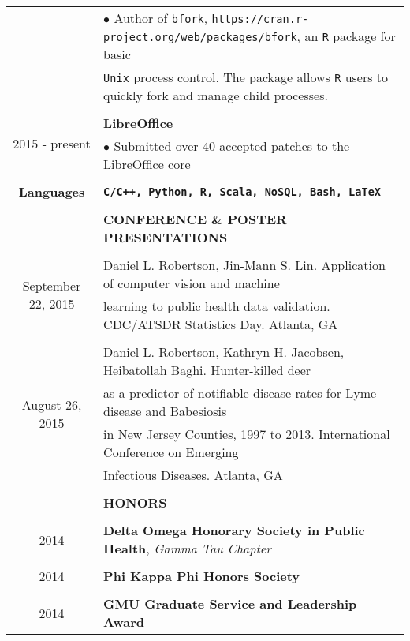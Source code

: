 \documentclass[10pt]{article}
\begin{document}
\begin{table}[ht]
\begin{tabular}{@{\hspace{0mm}}c@{\hspace{1mm}}c@{\hspace{3mm}}cl}
            & & & $\bullet$ Author of \texttt{bfork}, \texttt{https://cran.r-project.org/web/packages/bfork}, an \texttt{R} package for basic\\
            & & & \hspace*{3mm}\texttt{Unix} process control. The package allows \texttt{R} users to quickly fork and manage child processes.\\
            \\
            \multicolumn{3}{c}{\multirow{2}{*}{2015 - present}} & \textbf{LibreOffice}\\
            & & & $\bullet$ Submitted over 40 accepted patches to the LibreOffice core\\
            \\
            \multicolumn{3}{c}{\textbf{Languages}} & \textbf{\texttt{C/C++, Python, R, Scala, NoSQL, Bash, \LaTeX}}\\
            & & & \color{maroon}{\rule{14cm}{0.75pt}}\\
            & & & \large{\textbf{CONFERENCE \& POSTER PRESENTATIONS}}\\
            & & & \color{maroon}{\rule{14cm}{0.75pt}}\\
            \multicolumn{3}{c}{\multirow{2}{*}{September 22, 2015}} & Daniel L. Robertson, Jin-Mann S. Lin. Application of computer vision and machine\\
            & & & learning to public health data validation. CDC/ATSDR Statistics Day. Atlanta, GA\\
            \\
            \multicolumn{3}{c}{\multirow{4}{*}{August 26, 2015}} & Daniel L. Robertson, Kathryn H. Jacobsen, Heibatollah Baghi. Hunter-killed deer\\
            & & & as a predictor of notifiable disease rates for Lyme disease and Babesiosis\\
            & & & in New Jersey Counties, 1997 to 2013. International Conference on Emerging\\
            & & & Infectious Diseases. Atlanta, GA\\
            & & & \color{maroon}{\rule{14cm}{0.75pt}}\\
            & & & \large{\textbf{HONORS}}\\
            & & & \color{maroon}{\rule{14cm}{0.75pt}}\\
            \multicolumn{3}{c}{2014} & \textbf{Delta Omega Honorary Society in Public Health}, \textit{Gamma Tau Chapter}\\
            \\
            \multicolumn{3}{c}{2014} & \textbf{Phi Kappa Phi Honors Society}\\
            \\
            \multicolumn{3}{c}{2014} & \textbf{GMU Graduate Service and Leadership Award}\\
        \end{tabular}
    \end{table}
\end{document}
